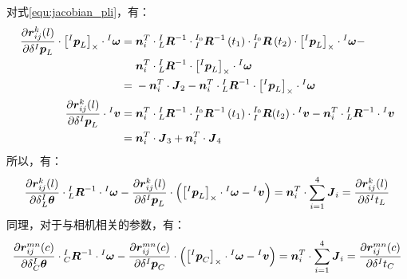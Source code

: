 对式\ref{equ:jacobian_pli}，有：
\begin{equation}
  \begin{aligned}
    \frac{\partial \boldsymbol{r}_{ij}^k(l)}{\partial \delta {^{I}\boldsymbol{p}_L}}
    \cdot\left[ {^{I}\boldsymbol{p}_L} \right]_\times\cdot{^{I}\boldsymbol{\omega}} =\;&
    \boldsymbol{n}_i^T\cdot
    {{^{I}_{L}}\boldsymbol{R}^{-1}}\cdot{{^{I_0}_{I}}\boldsymbol{R}^{-1}
      \left( t_1\right) }\cdot{{^{I_0}_{I}}\boldsymbol{R}\left( t_2\right) }
    \cdot\left[ {^{I}\boldsymbol{p}_L} \right]_\times
    \cdot{^{I}\boldsymbol{\omega}}-
    \\\;&\boldsymbol{n}_i^T\cdot
    {{^{I}_{L}}\boldsymbol{R}^{-1}}\cdot\left[ {^{I}\boldsymbol{p}_L} \right]_\times\cdot{^{I}\boldsymbol{\omega}}
    \\=\;&-\boldsymbol{n}_i^T\cdot\boldsymbol{J}_2-
    \boldsymbol{n}_i^T\cdot
    {{^{I}_{L}}\boldsymbol{R}^{-1}}\cdot\left[ {^{I}\boldsymbol{p}_L} \right]_\times\cdot{^{I}\boldsymbol{\omega}}
    \\
    \frac{\partial \boldsymbol{r}_{ij}^k(l)}{\partial \delta {^{I}\boldsymbol{p}_L}}
    \cdot{^{I}\boldsymbol{v}}           =\;&
    \boldsymbol{n}_i^T\cdot{{^{I}_{L}}\boldsymbol{R}^{-1}}
    \cdot{{^{I_0}_{I}}\boldsymbol{R}^{-1}\left( t_1\right) }
    \cdot{^{I_0}_{I}\boldsymbol{R}}(t_2)\cdot{^{I}\boldsymbol{v}}
    -\boldsymbol{n}_i^T\cdot{{^{I}_{L}}\boldsymbol{R}^{-1}}\cdot{^{I}\boldsymbol{v}} \\=\;&
    \boldsymbol{n}_i^T\cdot\boldsymbol{J}_3+\boldsymbol{n}_i^T\cdot\boldsymbol{J}_4
  \end{aligned}
\end{equation}
所以，有：
\begin{equation}
  \frac{\partial \boldsymbol{r}_{ij}^k(l)}{\partial \delta {^{I}_{L}\boldsymbol{\theta}}}
  \cdot{{^{I}_{L}}\boldsymbol{R}^{-1}}\cdot{^{I}\boldsymbol{\omega}}-
  \frac{\partial \boldsymbol{r}_{ij}^k(l)}{\partial \delta {^{I}\boldsymbol{p}_L}}
  \cdot
  \left(
  \left[ {^{I}\boldsymbol{p}_L} \right]_\times\cdot{^{I}\boldsymbol{\omega}}-{^{I}\boldsymbol{v}}
  \right) =
  \boldsymbol{n}_i^T\cdot\sum_{i=1}^{4}\boldsymbol{J}_i=
  \frac{\partial \boldsymbol{r}_{ij}^k(l)}{\partial \delta {^{I}t_{L}}}
\end{equation}
同理，对于与相机相关的参数，有：
\begin{equation}
  \frac{\partial \boldsymbol{r}_{ij}^{mn}(c)}{\partial \delta {^{I}_{C}\boldsymbol{\theta}}}
  \cdot{{^{I}_{C}}\boldsymbol{R}^{-1}}\cdot{^{I}\boldsymbol{\omega}}-
  \frac{\partial \boldsymbol{r}_{ij}^{mn}(c)}{\partial \delta {^{I}\boldsymbol{p}_C}}
  \cdot
  \left(
  \left[ {^{I}\boldsymbol{p}_C} \right]_\times\cdot{^{I}\boldsymbol{\omega}}-{^{I}\boldsymbol{v}}
  \right) =
  \boldsymbol{n}_i^T\cdot\sum_{i=1}^{4}\boldsymbol{J}_i=
  \frac{\partial \boldsymbol{r}_{ij}^{mn}(c)}{\partial \delta {^{I}t_{C}}}
\end{equation}
